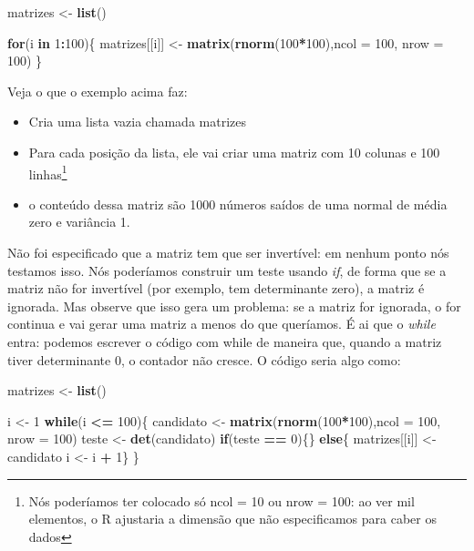 \documentclass[]{book}
\newenvironment{Shaded}{\begin{snugshade}}{\end{snugshade}}
\newcommand{\KeywordTok}[1]{\textcolor[rgb]{0.13,0.29,0.53}{\textbf{#1}}}
\newcommand{\DataTypeTok}[1]{\textcolor[rgb]{0.13,0.29,0.53}{#1}}
\newcommand{\DecValTok}[1]{\textcolor[rgb]{0.00,0.00,0.81}{#1}}
\newcommand{\StringTok}[1]{\textcolor[rgb]{0.31,0.60,0.02}{#1}}
\newcommand{\ControlFlowTok}[1]{\textcolor[rgb]{0.13,0.29,0.53}{\textbf{#1}}}
\newcommand{\OperatorTok}[1]{\textcolor[rgb]{0.81,0.36,0.00}{\textbf{#1}}}
\newcommand{\NormalTok}[1]{#1}
\providecommand{\tightlist}{%
  \setlength{\itemsep}{0pt}\setlength{\parskip}{0pt}}
\let\rmarkdownfootnote\footnote%
\def\footnote{\protect\rmarkdownfootnote}
\begin{document}
\begin{Shaded}
\begin{Highlighting}[]
\NormalTok{matrizes <-}\StringTok{ }\KeywordTok{list}\NormalTok{()}

\ControlFlowTok{for}\NormalTok{(i }\ControlFlowTok{in} \DecValTok{1}\OperatorTok{:}\DecValTok{100}\NormalTok{)\{}
\NormalTok{matrizes[[i]] <-}\StringTok{ }\KeywordTok{matrix}\NormalTok{(}\KeywordTok{rnorm}\NormalTok{(}\DecValTok{100}\OperatorTok{*}\DecValTok{100}\NormalTok{),}\DataTypeTok{ncol =} \DecValTok{100}\NormalTok{, }\DataTypeTok{nrow =} \DecValTok{100}\NormalTok{)}
\NormalTok{\}}
\end{Highlighting}
\end{Shaded}

Veja o que o exemplo acima faz:

\begin{itemize}
\tightlist
\item
  Cria uma lista vazia chamada matrizes
\item
  Para cada posição da lista, ele vai criar uma matriz com 10 colunas e
  100
  linhas\footnote{Nós poderíamos ter colocado só ncol = 10 ou nrow = 100: ao ver mil elementos, o R ajustaria a dimensão que não especificamos para caber os dados}
\item
  o conteúdo dessa matriz são 1000 números saídos de uma normal de média
  zero e variância 1.
\end{itemize}

Não foi especificado que a matriz tem que ser invertível: em nenhum
ponto nós testamos isso. Nós poderíamos construir um teste usando
\emph{if}, de forma que se a matriz não for invertível (por exemplo, tem
determinante zero), a matriz é ignorada. Mas observe que isso gera um
problema: se a matriz for ignorada, o for continua e vai gerar uma
matriz a menos do que queríamos. É ai que o \emph{while} entra: podemos
escrever o código com while de maneira que, quando a matriz tiver
determinante 0, o contador não cresce. O código seria algo como:

\begin{Shaded}
\begin{Highlighting}[]
\NormalTok{ matrizes <-}\StringTok{ }\KeywordTok{list}\NormalTok{()}
 
\NormalTok{ i <-}\StringTok{ }\DecValTok{1}
 \ControlFlowTok{while}\NormalTok{(i }\OperatorTok{<=}\StringTok{ }\DecValTok{100}\NormalTok{)\{}
\NormalTok{ candidato <-}\StringTok{ }\KeywordTok{matrix}\NormalTok{(}\KeywordTok{rnorm}\NormalTok{(}\DecValTok{100}\OperatorTok{*}\DecValTok{100}\NormalTok{),}\DataTypeTok{ncol =} \DecValTok{100}\NormalTok{, }\DataTypeTok{nrow =} \DecValTok{100}\NormalTok{)}
\NormalTok{ teste <-}\StringTok{ }\KeywordTok{det}\NormalTok{(candidato)}
 \ControlFlowTok{if}\NormalTok{(teste }\OperatorTok{==}\StringTok{ }\DecValTok{0}\NormalTok{)\{\} }\ControlFlowTok{else}\NormalTok{\{}
\NormalTok{ matrizes[[i]] <-}\StringTok{ }\NormalTok{candidato}
\NormalTok{ i <-}\StringTok{ }\NormalTok{i }\OperatorTok{+}\StringTok{ }\DecValTok{1}\NormalTok{\}}
\NormalTok{ \}}
\end{Highlighting}
\end{Shaded}
\end{document}
